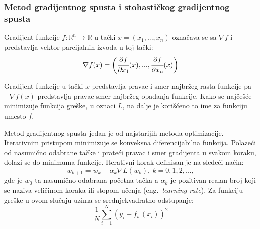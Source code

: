 \subsubsection{Metod gradijentnog spusta i stohastičkog gradijentnog spusta}
\label{sss:grad_spust}

Gradijent funkcije $f:\mathbb{R}^n \rightarrow \mathbb{R}$ u tački $x=(x_1, ..., x_n)$ označava se sa $\nabla f$ i predstavlja vektor parcijalnih izvoda u toj tački:
\begin{equation}
\nabla f(x) = \bigg( \cfrac{\partial f}{\partial x_1}(x),...,\cfrac{\partial f}{\partial x_n}(x) \bigg)
\end{equation}

Gradijent funkcije u tački $x$ predstavlja pravac i smer najbržeg rasta funkcije pa $- \nabla f(x)$ predstavlja pravac smer najbržeg opadanja funkcije. Kako se najčešće minimizuje funkcija greške, u oznaci $L$, na dalje je korišćeno to ime za funkciju umesto $f$.
\par 
Metod gradijentnog spusta jedan je od najstarijih metoda  optimizacije. Iterativnim pristupom minimizuje se konveksna diferencijabilna funkcija. Polazeći od nasumično odabrane tačke i prateći pravac i smer gradijenta u svakom koraku, dolazi se do minimuma funkcije. Iterativni korak definisan je na sledeći način:
\begin{equation}
	\label{eq:gradijentni_spust}
	w_{k+1} = w_k - \alpha_k \nabla L(w_k),~ k=0, 1, 2, ... ,
\end{equation}
gde je $w_0$ ta nasumično odabrana početna tačka a $\alpha_k$ je pozitivan realan broj koji se naziva veličinom koraka ili stopom učenja (eng.~{\em learning rate}). 
Za funkciju greške u ovom slučaju uzima se srednjekvadratno odstupanje:
\begin{equation}
	\frac{1}{N}\sum_{i=1}^{N} (y_i - f_w(x_i))^2
\end{equation}

